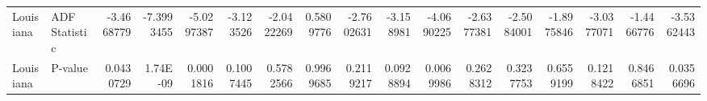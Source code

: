 \begin{table}
{\begin{tabular}{llrrrrrrrrrrrrrrr}
            Louisiana   & ADF Statistic & -3.4668779                          & -7.3993455               & -5.0297387               & -3.123526                & -2.0422269                 & 0.5809776                & -2.7602631                 & -3.158981               & -4.0690225              & -2.6377381                 & -2.5084001                 & -1.8975846                & -3.0377071                & -1.4466776                       & -3.5362443                       \\
            Louisiana   & P-value       & 0.0430729                           & 1.74E-09                 & 0.0001816                & 0.1007445                & 0.5782566                  & 0.9969685                & 0.2119217                  & 0.0928894               & 0.0069986               & 0.2628312                  & 0.3237753                  & 0.6559199                 & 0.1218422                 & 0.8466851                        & 0.0356696                        \\
            \bottomrule
        \end{tabular}%
        \label{DFtest}}%
\end{table}%

\clearpage


